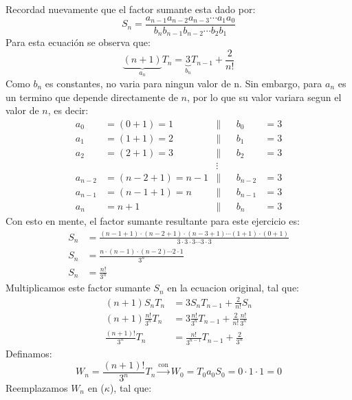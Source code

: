 
\begin{solution}
Recordad nuevamente que el factor sumante esta dado por:
$$S_n= \frac{a_{n-1}a_{n-2}a_{n-3}\cdots a_1a_0}{b_nb_{n-1}b_{n-2}\cdots b_2b_1}$$
Para esta ecuación se observa que:
$$\underbrace{(n + 1)}_{a_n}T_n = \underbrace{3}_{b_n}T_{n-1} + \frac{2}{n!}$$
Como $b_n$ es constantes, no varia para ningun valor de n. Sin embargo, para $a_n$ es un termino que depende directamente de $n$, por lo que su valor variara segun el valor de $n$, es decir:
\begin{align*}
    a_0&=(0+1)=1 &\|& &b_0&=3 \\
    a_1&=(1+1)=2 &\|& &b_1&=3 \\
    a_2&=(2+1)=3 &\|& &b_2&=3 \\
    &&\vdots&&&\\
    a_{n-2}&=(n-2+1)=n-1 &\|& &b_{n-2}&=3 \\
    a_{n-1}&=(n-1+1)=n &\|& &b_{n-1}&=3 \\
    a_n &=n+1 &\|& &b_n&=3
\end{align*}
Con esto en mente, el factor sumante resultante para este ejercicio es:
\begin{align*}
    S_n &= \frac{(n-1+1)\cdot(n-2+1)\cdot(n-3+1)\cdots(1+1)\cdot(0+1)}{3\cdot3\cdot3\cdots3\cdot3} \\
    S_n &= \frac{n\cdot(n-1)\cdot(n-2)\cdots2\cdot1}{3^n} \\
    S_n &= \frac{n!}{3^n}
\end{align*}
Multiplicamos este factor sumante $S_n$ en la ecuacion original, tal que:
\begin{align*}
   (n + 1)S_nT_n &= 3S_nT_{n-1} + \frac{2}{n!}S_n \\
   (n + 1)\frac{n!}{3^n}T_n &= 3\frac{n!}{3^n}T_{n-1} + \frac{2}{n!}\frac{n!}{3^n} \\
   \frac{(n+1)!}{3^n}T_n &= \frac{n!}{3^{n-1}}T_{n-1} + \frac{2}{3^n} \tag{$\kappa$}
\end{align*}
Definamos:
$$W_n = \frac{(n+1)!}{3^n}T_n \xrightarrow{\text{con}} W_0 = T_0a_0S_0 =0\cdot1\cdot1=0$$
Reemplazamos $W_n$ en ($\kappa$), tal que:

\end{solution}
